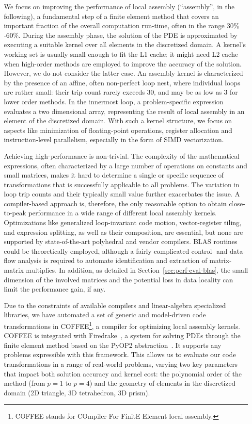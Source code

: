 \documentclass[conference]{IEEEtran}
\begin{document}
We focus on improving the performance of local assembly (``assembly'', in the following), a fundamental step of a finite element method that covers an important fraction of the overall computation run-time, often in the range 30$\%$-60$\%$. During the assembly phase, the solution of the PDE is approximated by executing a suitable kernel over all elements in the discretized domain. A kernel's working set is usually small enough to fit the L1 cache; it might need L2 cache when high-order methods are employed to improve the accuracy of the solution. However, we do not consider the latter case. An assembly kernel is characterized by the presence of an affine, often non-perfect loop nest, where individual loops are rather small: their trip count rarely exceeds 30, and may be as low as 3 for lower order methods. In the innermost loop, a problem-specific expression evaluates a two dimensional array, representing the result of local assembly in an element of the discretized domain. With such a kernel structure, we focus on aspects like minimization of floating-point operations, register allocation and instruction-level parallelism, especially in the form of SIMD vectorization.

Achieving high-performance is non-trivial. The complexity of the mathematical expressions, often characterized by a large number of operations on constants and small matrices, makes it hard to determine a single or specific sequence of transformations that is successfully applicable to all problems. The variation in loop trip counts and their typically small value further exacerbates the issue. A compiler-based approach is, therefore, the only reasonable option to obtain close-to-peak performance in a wide range of different local assembly kernels. Optimizations like generalized loop-invariant code motion, vector-register tiling, and expression splitting, as well as their composition, are essential, but none are supported by state-of-the-art polyhedral and vendor compilers. BLAS routines could be theoretically employed, although a fairly complicated control- and data-flow analysis is required to automate identification and extraction of matrix-matrix multiplies. In addition, as detailed in Section~\ref{sec:perf-eval-blas}, the small dimension of the involved matrices and the potential loss in data locality can limit the performance gain, if any.

Due to the constraints of available compilers and linear-algebra specialized libraries, we have automated a set of generic and model-driven code transformations in COFFEE\footnote{COFFEE stands for COmpiler For FinitE Element local assembly.}, a compiler for optimizing local assembly kernels. COFFEE is integrated with Firedrake~\cite{firedrake-code}, a system for solving PDEs through the finite element method based on the PyOP2 abstraction~\cite{pyop2isc}. It supports any problems expressible with this framework. This allows us to evaluate our code transformations in a range of real-world problems, varying two key parameters that impact both solution accuracy and kernel cost: the polynomial order of the method (from $p=1$ to $p=4$) and the geometry of elements in the discretized domain (2D triangle, 3D tetrahedron, 3D prism).
\end{document}
